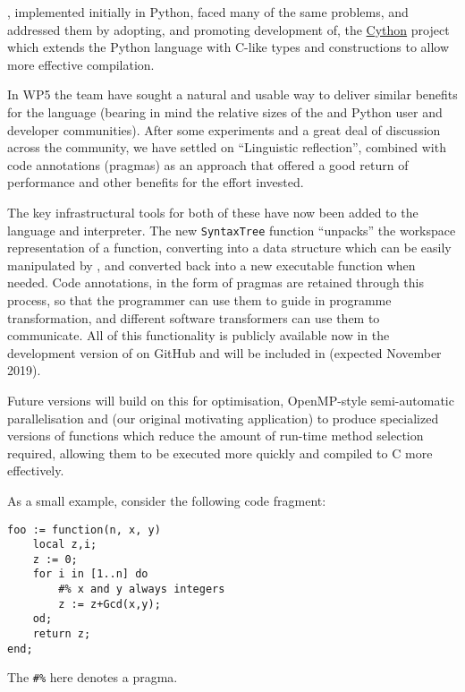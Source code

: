 \Sage, implemented initially in Python, faced many of the same
problems, and addressed them by adopting, and promoting
development of, the \href{http://cython.org}{Cython} project which
extends the Python language with C-like types and constructions to
allow more effective compilation.

In WP5 the \GAP team have sought a natural and usable way to deliver
similar benefits for the \GAP language (bearing in mind the relative
sizes of the \GAP and Python user and developer communities). After
some experiments and a great deal of discussion across the community,
we have settled on ``Linguistic reflection'', combined with code
annotations (pragmas) as an approach that offered a good return of
performance and other benefits for the effort invested.

The key infrastructural tools for both of these have now been added to
the \GAP language and interpreter. The new \verb|SyntaxTree| function
``unpacks'' the workspace representation of a \GAP function,
converting into a data structure which can be easily manipulated by
\GAP, and converted back into a new executable \GAP function when
needed. Code annotations, in the form of pragmas are retained through
this process, so that the programmer can use them to guide in
programme transformation, and different software transformers can use
them to communicate. All of this functionality is publicly available
now in the development version of \GAP on GitHub and will be included
in  (expected November 2019).

Future versions will build on this for optimisation, OpenMP-style
semi-automatic parallelisation and (our original motivating
application) to produce specialized versions of functions which reduce
the amount of run-time method selection required, allowing them to be
executed more quickly and compiled to C more effectively.

As a small example, consider the following code fragment:
\begin{verbatim}
foo := function(n, x, y)
    local z,i;
    z := 0;
    for i in [1..n] do
        #% x and y always integers
        z := z+Gcd(x,y);
    od;
    return z;
end;
\end{verbatim}
The \verb|#%| here denotes a pragma.

